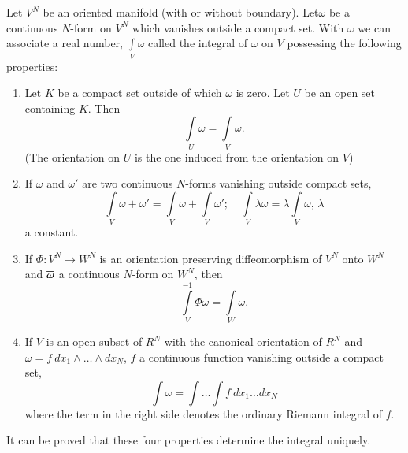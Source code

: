 Let $V^{N}$ be an oriented manifold (with or without
boundary). Let\pageoriginale $\omega$ be a continuous $N$-form on
$V^{N}$ which vanishes outside a compact set. With $\omega$ we can
associate a real number, $\int\limits_{V}\omega$ called the integral
of $\omega$ on $V$ possessing the following properties:
\begin{enumerate}
\renewcommand{\labelenumi}{\theenumi)}
\item Let $K$ be a compact set outside of which $\omega$ is zero. Let
  $U$ be an open set containing $K$. Then
$$
\int\limits_{U}\omega=\int\limits_{V}\omega.
$$
(The orientation on $U$ is the one induced from the orientation on
$V$) 

\item If $\omega$ and $\omega'$ are two continuous $N$-forms vanishing
  outside compact sets, 
$$
\int\limits_{V}\omega+\omega'=\int\limits_{V}\omega+\int\limits_{V}\omega';\quad
\int\limits_{V}\lambda \omega=\lambda\int\limits_{V}\omega, \,\lambda
$$
a constant.

\item If $\Phi:V^{N}\to W^{N}$ is an orientation preserving
  diffeomorphism of $V^{N}$ onto $W^{N}$ and $\overline{\omega}$ a
  continuous $N$-form on $W^{N}$, then
$$
\int\limits^{-1}_{V}\Phi\omega=\int\limits_{W}\omega.
$$

\item If $V$ is an open subset of $R^{N}$ with the canonical
  orientation of $R^{N}$ and $\omega=f\ dx_{1}\wedge\ldots\wedge
  dx_{N}$, $f$ a continuous function vanishing outside a compact set,
$$
\int\omega=\int\ldots\int f\ dx_{1}\ldots dx_{N}
$$
where the term in the right side denotes the ordinary Riemann integral
of $f$.
\end{enumerate}

It can be proved that these four properties determine the integral
uniquely.



